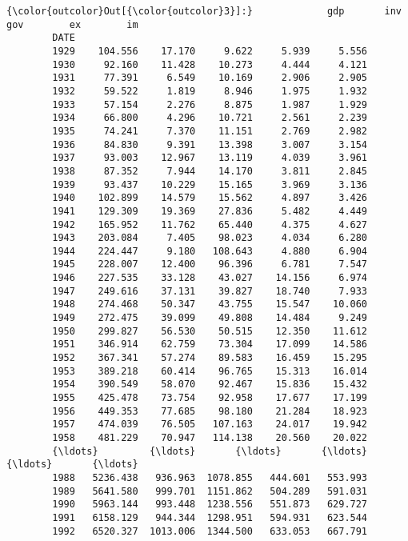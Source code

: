 \documentclass[11pt]{article}
\begin{document}
\begin{Verbatim}[commandchars=\\\{\}]
{\color{outcolor}Out[{\color{outcolor}3}]:}             gdp       inv       gov        ex        im
        DATE                                                   
        1929    104.556    17.170     9.622     5.939     5.556
        1930     92.160    11.428    10.273     4.444     4.121
        1931     77.391     6.549    10.169     2.906     2.905
        1932     59.522     1.819     8.946     1.975     1.932
        1933     57.154     2.276     8.875     1.987     1.929
        1934     66.800     4.296    10.721     2.561     2.239
        1935     74.241     7.370    11.151     2.769     2.982
        1936     84.830     9.391    13.398     3.007     3.154
        1937     93.003    12.967    13.119     4.039     3.961
        1938     87.352     7.944    14.170     3.811     2.845
        1939     93.437    10.229    15.165     3.969     3.136
        1940    102.899    14.579    15.562     4.897     3.426
        1941    129.309    19.369    27.836     5.482     4.449
        1942    165.952    11.762    65.440     4.375     4.627
        1943    203.084     7.405    98.023     4.034     6.280
        1944    224.447     9.180   108.643     4.880     6.904
        1945    228.007    12.400    96.396     6.781     7.547
        1946    227.535    33.128    43.027    14.156     6.974
        1947    249.616    37.131    39.827    18.740     7.933
        1948    274.468    50.347    43.755    15.547    10.060
        1949    272.475    39.099    49.808    14.484     9.249
        1950    299.827    56.530    50.515    12.350    11.612
        1951    346.914    62.759    73.304    17.099    14.586
        1952    367.341    57.274    89.583    16.459    15.295
        1953    389.218    60.414    96.765    15.313    16.014
        1954    390.549    58.070    92.467    15.836    15.432
        1955    425.478    73.754    92.958    17.677    17.199
        1956    449.353    77.685    98.180    21.284    18.923
        1957    474.039    76.505   107.163    24.017    19.942
        1958    481.229    70.947   114.138    20.560    20.022
        {\ldots}         {\ldots}       {\ldots}       {\ldots}       {\ldots}       {\ldots}
        1988   5236.438   936.963  1078.855   444.601   553.993
        1989   5641.580   999.701  1151.862   504.289   591.031
        1990   5963.144   993.448  1238.556   551.873   629.727
        1991   6158.129   944.344  1298.951   594.931   623.544
        1992   6520.327  1013.006  1344.500   633.053   667.791

\end{Verbatim}
\end{document}
